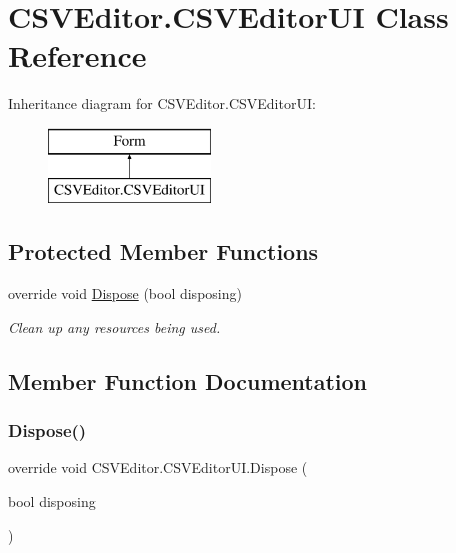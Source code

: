 \hypertarget{class_c_s_v_editor_1_1_c_s_v_editor_u_i}{}\section{C\+S\+V\+Editor.\+C\+S\+V\+Editor\+UI Class Reference}
\label{class_c_s_v_editor_1_1_c_s_v_editor_u_i}
Inheritance diagram for C\+S\+V\+Editor.\+C\+S\+V\+Editor\+UI\+:\begin{figure}[H]
\begin{center}
\leavevmode
\includegraphics[height=2.000000cm]{class_c_s_v_editor_1_1_c_s_v_editor_u_i}
\end{center}
\end{figure}
\subsection*{Protected Member Functions}
\begin{DoxyCompactItemize}
\item 
override void \mbox{\hyperlink{class_c_s_v_editor_1_1_c_s_v_editor_u_i_ae30ba2e7518a3d71966178c7bc93b53a}{Dispose}} (bool disposing)
\begin{DoxyCompactList}\small\item\em Clean up any resources being used. \end{DoxyCompactList}\end{DoxyCompactItemize}


\subsection{Member Function Documentation}
\mbox{\label{class_c_s_v_editor_1_1_c_s_v_editor_u_i_ae30ba2e7518a3d71966178c7bc93b53a}} 
\subsubsection{\texorpdfstring{Dispose()}{Dispose()}}
{\footnotesize\ttfamily override void C\+S\+V\+Editor.\+C\+S\+V\+Editor\+U\+I.\+Dispose (\begin{DoxyParamCaption}\item[{bool}]{disposing }\end{DoxyParamCaption})\hspace{0.3cm}{\ttfamily [protected]}}



